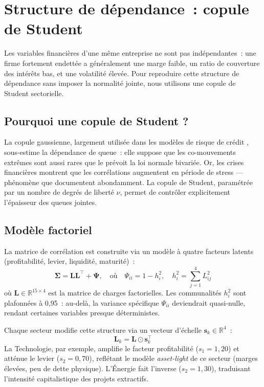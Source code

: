 \documentclass[12pt, a4paper, twoside, openright]{report}
\theoremstyle{definition}
\begin{document}
\section{Structure de dépendance~: copule de Student}
\label{sec:donnees:copule}

Les variables financières d'une même entreprise ne sont pas indépendantes~: une firme fortement endettée a généralement une marge faible, un ratio de couverture des intérêts bas, et une volatilité élevée.
Pour reproduire cette structure de dépendance sans imposer la normalité jointe, nous utilisons une copule de Student sectorielle.

\subsection{Pourquoi une copule de Student ?}

La copule gaussienne, largement utilisée dans les modèles de risque de crédit \citep{vasicek2002}, sous-estime la dépendance de queue~: elle suppose que les co-mouvements extrêmes sont aussi rares que le prévoit la loi normale bivariée.
Or, les crises financières montrent que les corrélations augmentent en période de stress --- phénomène que \citet{mcneil_frey_embrechts2015} documentent abondamment.
La copule de Student, paramétrée par un nombre de degrés de liberté $\nu$, permet de contrôler explicitement l'épaisseur des queues jointes.

\subsection{Modèle factoriel}

La matrice de corrélation est construite via un modèle à quatre facteurs latents (profitabilité, levier, liquidité, maturité)~:
%
\begin{equation}
\label{eq:copula_corr}
\boldsymbol{\Sigma} = \mathbf{L}\mathbf{L}^\top + \boldsymbol{\Psi}, \quad \text{où} \quad \Psi_{ii} = 1 - h_i^2, \quad h_i^2 = \sum_{j=1}^{4} L_{ij}^2
\end{equation}
%
où $\mathbf{L} \in \mathbb{R}^{15 \times 4}$ est la matrice de charges factorielles.
Les communalités $h_i^2$ sont plafonnées à 0{,}95~: au-delà, la variance spécifique $\Psi_{ii}$ deviendrait quasi-nulle, rendant certaines variables presque déterministes.

Chaque secteur modifie cette structure via un vecteur d'échelle $\mathbf{s}_k \in \mathbb{R}^4$~:
%
\begin{equation}
\mathbf{L}_k = \mathbf{L} \odot \mathbf{s}_k^\top
\end{equation}
%
La Technologie, par exemple, amplifie le facteur profitabilité ($s_1 = 1{,}20$) et atténue le levier ($s_2 = 0{,}70$), reflétant le modèle \emph{asset-light} de ce secteur (marges élevées, peu de dette physique).
L'Énergie fait l'inverse ($s_2 = 1{,}30$), traduisant l'intensité capitalistique des projets extractifs.
\end{document}
